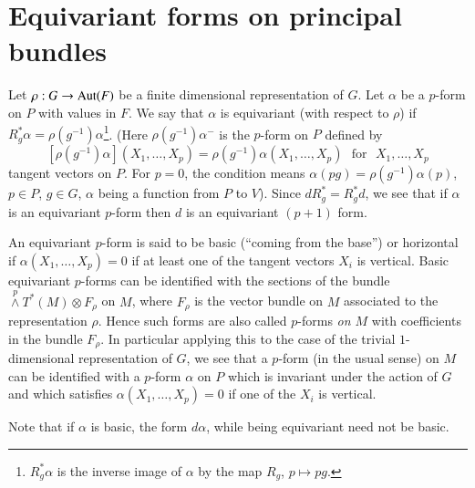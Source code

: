 \section*{Equivariant forms on principal bundles}
\pageoriginale

Let $\rho:G\to\operatorname{Aut} (F)$ be a finite dimensional representation of $G$. Let $\alpha$ be a $p$-form on $P$ with values in $F$. We say that $\alpha$ is equivariant (with respect to $\rho$) if $R^{*}_{g}\alpha=\rho(g^{-1})\alpha$\footnote[2]{$R^{*}_{g}\alpha$ is the inverse image of $\alpha$ by the map $R_{g}$, $p\mapsto pg$.}. (Here $\rho(g^{-1})\alpha^{-}$ is the $p$-form on $P$ defined by 
$$
[\rho(g^{-1})\alpha](X_{1},\ldots,X_{p})=\rho(g^{-1})\alpha(X_{1},\ldots,X_{p})\text{~ for~ } X_{1},\ldots,X_{p}
$$
tangent vectors on $P$. For $p=0$, the condition means $\alpha(pg)=\rho(g^{-1})\alpha(p)$, $p\in P$, $g\in G$, $\alpha$ being a function from $P$ to $V$). Since $dR^{*}_{g}=R^{*}_{g}d$, we see that if $\alpha$ is an equivariant $p$-form then $d$ is an equivariant $(p+1)$ form.

An equivariant $p$-form is said to be basic (``coming from the base'') or horizontal if $\alpha(X_{1},\ldots,X_{p})=0$ if at least one of the tangent vectors $X_{i}$ is vertical. Basic equivariant $p$-forms can be identified with the sections of the bundle ${\displaystyle{\mathop{\wedge}\limits^{p}}}T^{*}(M)\otimes F_{\rho}$ on $M$, where $F_{\rho}$ is the vector bundle on $M$ associated to the representation $\rho$. Hence such forms are also called $p$-forms {\em on $M$} with coefficients in the bundle $F_{\rho}$. In particular applying this to the case of the trivial $1$-dimensional representation of $G$, we see that a $p$-form (in the usual sense) on $M$ can be identified with a $p$-form $\alpha$ on $P$ which is invariant under the action of $G$ and which satisfies $\alpha(X_{1},\ldots,X_{p})=0$ if one of the $X_{i}$ is vertical.

Note that if $\alpha$ is basic, the form $d\alpha$, while being equivariant need not be basic.

